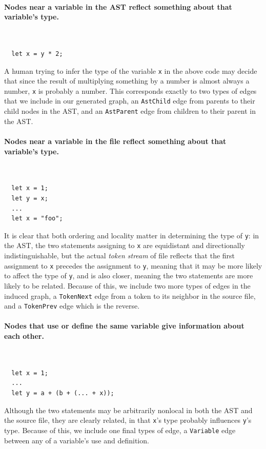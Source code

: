 \paragraph{Nodes near a variable in the AST reflect something about that variable's type.}\
\ %
\begin{lstlisting}
  let x = y * 2;
\end{lstlisting}
A human trying to infer the type of the variable \texttt{x} in the above code may decide that since the result of multiplying something by a number is almost always a number, \texttt{x} is probably a number.
This corresponds exactly to two types of edges that we include in our generated graph, an \texttt{AstChild} edge from parents to their child nodes in the AST, and an \texttt{AstParent} edge from children to their parent in the AST.

\par\paragraph{Nodes near a variable in the file reflect something about that variable's type.}
\ %
\begin{lstlisting}
  let x = 1;
  let y = x;
  ...
  let x = "foo";
\end{lstlisting}
It is clear that both ordering and locality matter in determining the type of \texttt{y}: in the AST, the two statements assigning to \texttt{x} are equidistant and directionally indistinguishable, but the actual \emph{token stream} of file reflects that the first assignment to \texttt{x} precedes the assignment to \texttt{y}, meaning that it may be more likely to affect the type of \texttt{y}, and is also closer, meaning the two statements are more likely to be related.
Because of this, we include two more types of edges in the induced graph, a \texttt{TokenNext} edge from a token to its neighbor in the source file, and a \texttt{TokenPrev} edge which is the reverse.

\paragraph{Nodes that use or define the same variable give information about each other.}
\ %
\begin{lstlisting}
  let x = 1;
  ...
  let y = a + (b + (... + x));
\end{lstlisting}
Although the two statements may be arbitrarily nonlocal in both the AST and the source file, they are clearly related, in that \texttt{x}'s type probably influences \texttt{y}'s type.
Because of this, we include one final types of edge, a \texttt{Variable} edge between any of a variable's use and definition.

